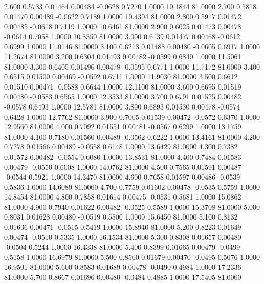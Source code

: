    2.600   0.5733   0.01464   0.00484  -0.0628   0.7270   1.0000  10.1844  81.0000
   2.700   0.5818   0.01470   0.00489  -0.0622   0.7189   1.0000  10.4304  81.0000
   2.800   0.5917   0.01472   0.00485  -0.0618   0.7119   1.0000  10.6461  81.0000
   2.900   0.6025   0.01473   0.00478  -0.0614   0.7058   1.0000  10.8350  81.0000
   3.000   0.6139   0.01477   0.00468  -0.0612   0.6999   1.0000  11.0146  81.0000
   3.100   0.6213   0.01488   0.00480  -0.0605   0.6917   1.0000  11.2674  81.0000
   3.200   0.6304   0.01493   0.00482  -0.0599   0.6840   1.0000  11.5061  81.0000
   3.300   0.6405   0.01496   0.00478  -0.0595   0.6771   1.0000  11.7172  81.0000
   3.400   0.6515   0.01500   0.00469  -0.0592   0.6711   1.0000  11.9030  81.0000
   3.500   0.6612   0.01510   0.00471  -0.0588   0.6644   1.0000  12.1100  81.0000
   3.600   0.6695   0.01519   0.00480  -0.0583   0.6565   1.0000  12.3533  81.0000
   3.700   0.6791   0.01525   0.00482  -0.0578   0.6493   1.0000  12.5781  81.0000
   3.800   0.6893   0.01530   0.00478  -0.0574   0.6428   1.0000  12.7762  81.0000
   3.900   0.7005   0.01539   0.00472  -0.0572   0.6370   1.0000  12.9560  81.0000
   4.000   0.7092   0.01551   0.00481  -0.0567   0.6299   1.0000  13.1759  81.0000
   4.100   0.7180   0.01560   0.00489  -0.0562   0.6222   1.0000  13.4161  81.0000
   4.200   0.7278   0.01566   0.00489  -0.0558   0.6148   1.0000  13.6429  81.0000
   4.300   0.7382   0.01572   0.00482  -0.0554   0.6080   1.0000  13.8531  81.0000
   4.400   0.7484   0.01583   0.00479  -0.0550   0.6008   1.0000  14.0762  81.0000
   4.500   0.7565   0.01591   0.00487  -0.0544   0.5921   1.0000  14.3470  81.0000
   4.600   0.7658   0.01597   0.00486  -0.0539   0.5836   1.0000  14.6089  81.0000
   4.700   0.7759   0.01602   0.00478  -0.0535   0.5759   1.0000  14.8454  81.0000
   4.800   0.7858   0.01614   0.00475  -0.0531   0.5681   1.0000  15.0862  81.0000
   4.900   0.7940   0.01622   0.00482  -0.0525   0.5589   1.0000  15.3708  81.0000
   5.000   0.8031   0.01628   0.00480  -0.0519   0.5500   1.0000  15.6450  81.0000
   5.100   0.8132   0.01636   0.00471  -0.0515   0.5419   1.0000  15.8940  81.0000
   5.200   0.8223   0.01649   0.00474  -0.0510   0.5335   1.0000  16.1534  81.0000
   5.300   0.8308   0.01657   0.00480  -0.0504   0.5244   1.0000  16.4338  81.0000
   5.400   0.8399   0.01665   0.00479  -0.0499   0.5158   1.0000  16.6979  81.0000
   5.500   0.8500   0.01679   0.00470  -0.0495   0.5076   1.0000  16.9501  81.0000
   5.600   0.8583   0.01689   0.00478  -0.0490   0.4984   1.0000  17.2336  81.0000
   5.700   0.8667   0.01696   0.00480  -0.0484   0.4885   1.0000  17.5405  81.0000
